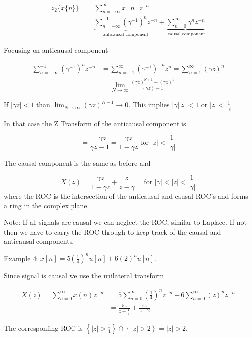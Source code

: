 \documentclass{article}
\begin{document}
$$
\begin{aligned}
  z_{2}\{x\{n\}\} &=\sum_{n=-\infty}^{\infty} x[n] z^{-n}\\
  &= \underbrace{\sum_{n=-\infty}^{-1}\left(\gamma^{-1}\right)^{n} z^{-n}}_{\text { anticausal component }} + \underbrace{\sum_{n=0}^{\infty} \gamma^{n} z^{-n}}_{\text { causal component}}
\end{aligned}
$$

Focusing on anticausal component

$$
\begin{aligned}
\sum_{n=-\infty}^{-1}\left(\gamma^{-1}\right)^{n} z^{-n} & =\sum_{n=+1}^{\infty}\left(\gamma^{-1}\right)^{-n} z^{n}=\sum_{n=1}^{\infty}\left(\gamma z\right)^{n} \\
& =\lim _{N \rightarrow \infty} \frac{(\gamma z)^{N+1}-(\gamma z)^{1}}{(\gamma z)-1}
\end{aligned}
$$

If $|\gamma z|<1$ than $\lim_{N \rightarrow \infty}(\gamma z)^{N+1} \rightarrow 0$. This implies $|\gamma||z|<1$ or $|z|<\frac{1}{|\gamma|}$.

In that case the Z Transform of the anticausal component is

$$
=\frac{-\gamma z}{\gamma z - 1}=\frac{\gamma z}{1-\gamma z} \text { for  } |z|<\frac{1}{|\gamma|}
$$

The causal component is the same as before and

$$
X(z) =\frac{\gamma z}{1-\gamma z}+\frac{z}{z-\gamma} \quad \text { for } |\gamma|<|z|<\frac{1}{|\gamma|} 
$$
where the ROC is the intersection of the anticausal and causal ROC's and forms a ring in the complex plane.

Note: If all signals are causal we can neglect the ROC, similar to Laplace. If not then we have to carry the ROC through to keep track of the causal and anticausal components.

Example 4: $x[n]=5\left(\frac{1}{4}\right)^{n} u[n]+6(2)^{n} u[n]$.

Since signal is causal we use the unilateral transform

$$
\begin{aligned}
X(z)=\sum_{n=0}^{\infty} x(n) z^{-n} & =5 \sum_{n=0}^{\infty}\left(\frac{1}{4}\right)^{n} z^{-n}+6 \sum_{n=0}^{\infty}(z)^{n} z^{-n} \\
& =\frac{5 z}{z-\frac{1}{4}}+\frac{6 z}{z-2}
\end{aligned}
$$

The corresponfing ROC is $\left\{|z|>\frac{1}{4}\right\} \cap \left\{|z|> 2\right\} = |z| > 2$.
\end{document}
